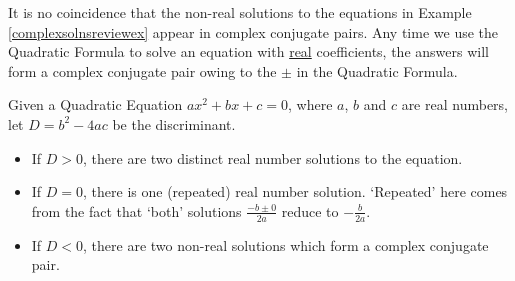 \documentclass{ximera}
\begin{document}
It is no coincidence that the non-real solutions to the equations in Example \ref{complexsolnsreviewex} appear in  complex conjugate pairs. Any time we use the Quadratic Formula to solve an equation with \underline{real} coefficients, the answers will form a  complex conjugate pair owing to the $\pm$ in the Quadratic Formula.  %

\begin{theorem} 
    \label{discriminanttheoremcomplexversion}
    Given a Quadratic Equation $ax^2 + bx + c = 0$, where $a$, $b$ and $c$ are real numbers, let $D = b^2 - 4ac$ be the discriminant.
    \begin{itemize}
        \item  If $D > 0$, there are two distinct real number solutions to the equation. 
        \item  If $D = 0$, there is one (repeated) real number solution.  `Repeated' here comes from the fact that `both' solutions $\frac{-b \pm 0}{2a}$ reduce to $-\frac{b}{2a}$.
        \item  If $D < 0$, there are two non-real solutions which form a complex conjugate pair.
    \end{itemize}
\end{theorem}
\end{document}
